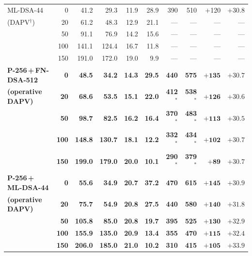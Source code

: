 \documentclass[preprint,10pt,3p]{elsarticle}
\begin{document}
\begin{table}[htbp]
{\begin{tabular}{@{}l r rr rr  rr rr@{}}
\addlinespace[3pt]
ML-DSA-44             &   0 &  41.2 &  29.3 & 11.9 & 28.9 & 390 & 510 & $+$120  & $+$30.8 \\
(DAPV$^\dagger$)      &  20 &  61.2 &  48.3 & 12.9 & 21.1 & --- & --- & ---     & ---    \\
                      &  50 &  91.1 &  76.9 & 14.2 & 15.6 & --- & --- & ---     & ---    \\
                      & 100 & 141.1 & 124.4 & 16.7 & 11.8 & --- & --- & ---     & ---    \\
                      & 150 & 191.0 & 172.0 & 19.0 &  9.9 & --- & --- & ---     & ---    \\
\addlinespace[5pt]
\textbf{P-256\,+\,FN-DSA-512}  &   \textbf{0} &  \textbf{48.5} & \textbf{34.2} & \textbf{14.3} & \textbf{29.5} & \textbf{440} & \textbf{575}       & $\mathbf{+135}$ & $\mathbf{+30.7}$ \\
\textbf{(operative DAPV)}       &  \textbf{20} &  \textbf{68.6} & \textbf{53.5} & \textbf{15.1} & \textbf{22.0} & \textbf{412}$^*$ & \textbf{538}$^*$ & $\mathbf{+126}$ & $\mathbf{+30.6}$ \\
                                &  \textbf{50} &  \textbf{98.7} & \textbf{82.5} & \textbf{16.2} & \textbf{16.4} & \textbf{370}$^*$ & \textbf{483}$^*$ & $\mathbf{+113}$ & $\mathbf{+30.5}$ \\
                                & \textbf{100} & \textbf{148.8} & \textbf{130.7} & \textbf{18.1} & \textbf{12.2} & \textbf{332}$^*$ & \textbf{434}$^*$ & $\mathbf{+102}$ & $\mathbf{+30.7}$ \\
                                & \textbf{150} & \textbf{199.0} & \textbf{179.0} & \textbf{20.0} & \textbf{10.1} & \textbf{290}$^*$ & \textbf{379}$^*$ & $\mathbf{+89}$  & $\mathbf{+30.7}$ \\
\addlinespace[5pt]
\textbf{P-256\,+\,ML-DSA-44}   &   \textbf{0} &  \textbf{55.6} & \textbf{34.9} & \textbf{20.7} & \textbf{37.2} & \textbf{470} & \textbf{615} & $\mathbf{+145}$ & $\mathbf{+30.9}$ \\
\textbf{(operative DAPV)}       &  \textbf{20} &  \textbf{75.7} & \textbf{54.9} & \textbf{20.8} & \textbf{27.5} & \textbf{440} & \textbf{580} & $\mathbf{+140}$ & $\mathbf{+31.8}$ \\
                                &  \textbf{50} & \textbf{105.8} & \textbf{85.0} & \textbf{20.8} & \textbf{19.7} & \textbf{395} & \textbf{525} & $\mathbf{+130}$ & $\mathbf{+32.9}$ \\
                                & \textbf{100} & \textbf{155.9} & \textbf{135.0} & \textbf{20.9} & \textbf{13.4} & \textbf{355} & \textbf{470} & $\mathbf{+115}$ & $\mathbf{+32.4}$ \\
                                & \textbf{150} & \textbf{206.0} & \textbf{185.0} & \textbf{21.0} & \textbf{10.2} & \textbf{310} & \textbf{415} & $\mathbf{+105}$ & $\mathbf{+33.9}$ \\
\bottomrule
\end{tabular}%
}
\end{table}
\end{document}
